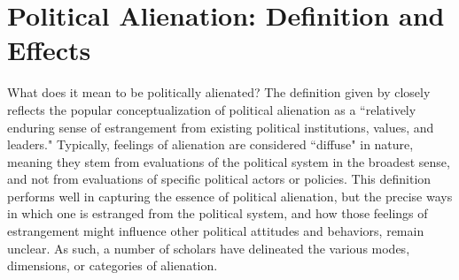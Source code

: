 \documentclass[12pt]{article}
\begin{document}
 





\section{Political Alienation: Definition and Effects}
What does it mean to be politically alienated? The definition given by \textcite[][3]{citrin1975} closely reflects the popular conceptualization of political alienation as a ``relatively enduring sense of estrangement from existing political institutions, values, and leaders." Typically, feelings of alienation are considered ``diffuse" \parencite{easton1965systems} in nature, meaning they stem from evaluations of the political system in the broadest sense, and not from evaluations of specific political actors or policies. This definition performs well in capturing the essence of political alienation, but the precise ways in which one is estranged from the political system, and how those feelings of estrangement might influence other political attitudes and behaviors, remain unclear. As such, a number of scholars have delineated the various modes, dimensions, or categories of alienation. 
\end{document}
